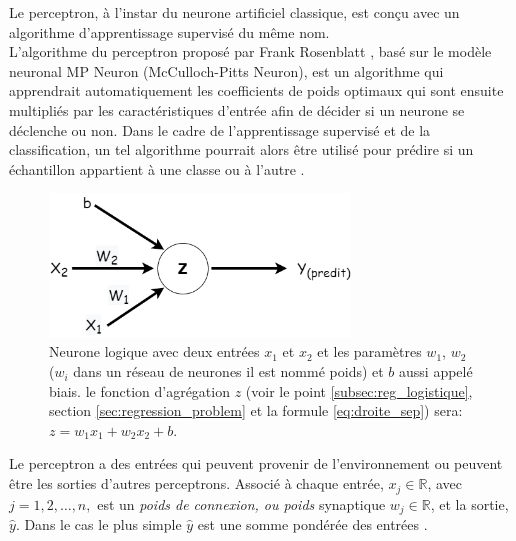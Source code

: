 	
	Le perceptron, à l'instar du neurone artificiel classique, est conçu avec un algorithme d'apprentissage supervisé du même nom.\\
	L'algorithme du perceptron proposé par Frank Rosenblatt \cite{antoine2018apprentissage}, basé sur le modèle neuronal MP Neuron (McCulloch-Pitts Neuron), est un algorithme qui apprendrait automatiquement les coefficients de poids optimaux qui sont ensuite multipliés par les caractéristiques d'entrée afin de décider si un neurone se déclenche ou non. Dans le cadre de l'apprentissage supervisé et de la classification, un tel algorithme pourrait alors être utilisé pour prédire si un échantillon appartient à une classe ou à l'autre \cite{ml2008python}.
	\begin{figure}[H]%
		\centering
		\includegraphics[width=8cm]{images/neuron-3-param.png}
		\caption[Neurone logique avec deux entrées $x_1$ et $x_2$ et les paramètres $w_1$, $w_2$ et $b$.]{Neurone logique avec deux entrées $x_1$ et $x_2$ et les paramètres $w_1$, $w_2$ ($w_i$ dans un réseau de neurones il est nommé poids) et $b$ aussi appelé biais. le fonction d'agrégation $z$ (voir le point \ref{subsec:reg_logistique}, section \ref{sec:regression_problem}  et la formule \ref{eq:droite_sep})  sera: $z=w_1 x_1 +w_2 x_2 + b$.}
		\label{fig:logic_neuron}
	\end{figure}
	
	
	
	Le perceptron a des entrées qui peuvent provenir de l'environnement ou peuvent être les sorties d'autres perceptrons.
	Associé à chaque entrée, $ x_j \in \mathbb{R}$, avec $ j = 1,2, \dots , n, $ est un \textit{poids de connexion, ou poids} synaptique $w_j \in \mathbb{R}$, et la sortie, $\hat{y}$. Dans le cas le plus simple $\hat{y}$ est une somme pondérée des entrées \cite{alpaydin2010introduction}.
	
